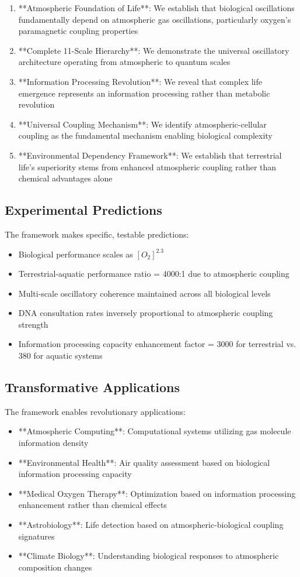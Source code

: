 \documentclass[twocolumn]{article}
\begin{document}
\begin{enumerate}
\item **Atmospheric Foundation of Life**: We establish that biological oscillations fundamentally depend on atmospheric gas oscillations, particularly oxygen's paramagnetic coupling properties
\item **Complete 11-Scale Hierarchy**: We demonstrate the universal oscillatory architecture operating from atmospheric to quantum scales
\item **Information Processing Revolution**: We reveal that complex life emergence represents an information processing rather than metabolic revolution
\item **Universal Coupling Mechanism**: We identify atmospheric-cellular coupling as the fundamental mechanism enabling biological complexity
\item **Environmental Dependency Framework**: We establish that terrestrial life's superiority stems from enhanced atmospheric coupling rather than chemical advantages alone
\end{enumerate}

\subsection{Experimental Predictions}

The framework makes specific, testable predictions:
\begin{itemize}
\item Biological performance scales as $[O_2]^{2.3}$
\item Terrestrial-aquatic performance ratio = 4000:1 due to atmospheric coupling
\item Multi-scale oscillatory coherence maintained across all biological levels
\item DNA consultation rates inversely proportional to atmospheric coupling strength
\item Information processing capacity enhancement factor = 3000 for terrestrial vs. 380 for aquatic systems
\end{itemize}

\subsection{Transformative Applications}

The framework enables revolutionary applications:
\begin{itemize}
\item **Atmospheric Computing**: Computational systems utilizing gas molecule information density
\item **Environmental Health**: Air quality assessment based on biological information processing capacity  
\item **Medical Oxygen Therapy**: Optimization based on information processing enhancement rather than chemical effects
\item **Astrobiology**: Life detection based on atmospheric-biological coupling signatures
\item **Climate Biology**: Understanding biological responses to atmospheric composition changes
\end{itemize}
\end{document}
